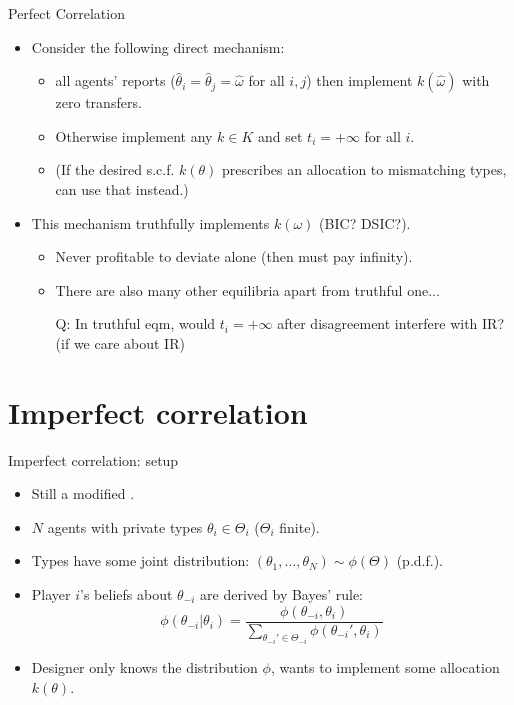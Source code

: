\documentclass[english,10pt
,aspectratio=169
]{beamer}
\begin{document}
\begin{frame}{Perfect Correlation}
\begin{itemize}
	\item Consider the following direct mechanism:
	\begin{itemize}
		\item {} all agents' reports  ($\hat{\theta}_i=\hat{\theta}_j=\hat{\omega}$ for all $i,j$) then implement $k(\hat{\omega})$ with zero transfers.
		\item \alert{Otherwise} implement any $k \in K$ and set \alert{$t_i = +\infty$} for all $i$.
		\item (If the desired s.c.f. $k(\theta)$ prescribes an allocation to mismatching types, can use that instead.)
	\end{itemize}
	\item This mechanism truthfully implements $k(\omega)$ (BIC? DSIC?).
	\begin{itemize}
		\item Never profitable to deviate alone (then must pay infinity).
		\item There are also many other equilibria apart from truthful one...
		\item[Q:] In truthful eqm, would $t_i = +\infty$ after disagreement interfere with IR? (if we care about IR)
	\end{itemize}
\end{itemize}
\end{frame}


\section{Imperfect correlation}

\begin{frame}{Imperfect correlation: setup}
\begin{itemize}
	\item Still a modified .
	\item $N$ agents with private types $\theta_i \in \Theta_i$ ($\Theta_i$ finite).
	\item Types have some joint distribution: $(\theta_1,...,\theta_N) \sim \phi(\Theta)$ (p.d.f.).
	\item Player $i$'s beliefs about $\theta_{-i}$ are derived by Bayes' rule:
	$$\phi(\theta_{-i}|\theta_i) = \frac{\phi(\theta_{-i},\theta_i)}{\sum_{\theta_{-i}' \in \Theta_{-i}} \phi(\theta_{-i}',\theta_i)} $$
	\item Designer only knows the distribution $\phi$, wants to implement some allocation $k(\theta)$.
\end{itemize}
\end{frame}
\end{document}
